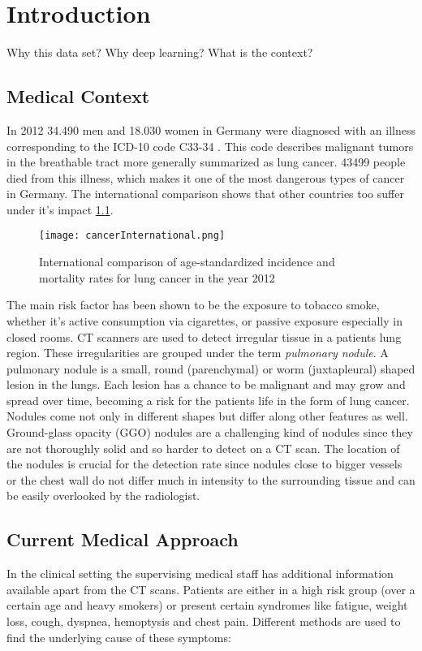 \documentclass[main.tex]{subfiles}
\begin{document}
\chapter{Introduction}
Why this data set?
Why deep learning?
What is the context?

\section{Medical Context}
In 2012 34.490 men and 18.030 women in Germany were diagnosed with an illness corresponding to the ICD-10 code C33-34 \cite{koch2015krebs}. This code describes malignant tumors in the breathable tract more generally summarized as lung cancer. 43499 people died from this illness, which makes it one of the most dangerous types of cancer in Germany. The international comparison shows that other countries too suffer under it's impact \ref{fig:cancInt}.

\begin{figure}[ht]
\texttt{[image: cancerInternational.png]}
\caption{International comparison of age-standardized incidence and mortality rates for lung cancer in the year 2012}
\label{fig:cancInt}
\end{figure}

The main risk factor has been shown to be the exposure to tobacco smoke, whether it's active consumption via cigarettes, or passive exposure especially in closed rooms. CT scanners are used to detect irregular tissue in a patients lung region. These irregularities are grouped under the term \textit{pulmonary nodule}. A pulmonary nodule is a small, round (parenchymal) or worm (juxtapleural) shaped lesion in the lungs. Each lesion has a chance to be malignant and may grow and spread over time, becoming a risk for the patients life in the form of lung cancer. Nodules come not only in different shapes but differ along other features as well. Ground-glass opacity (GGO) nodules are a challenging kind of nodules since they are not thoroughly solid and so harder to detect on a CT scan. The location of the nodules is crucial for the detection rate since nodules close to bigger vessels or the chest wall do not differ much in intensity to the surrounding tissue and can be easily overlooked by the radiologist.


\section{Current Medical Approach}
In the clinical setting the supervising medical staff has additional information available apart from the CT scans. Patients are either in a high risk group (over a certain age and heavy smokers) or present certain syndromes like fatigue, weight loss, cough, dyspnea, hemoptysis and chest pain. Different methods are used to find the underlying cause of these symptoms:
\end{document}
